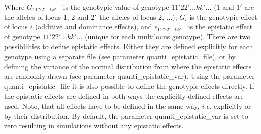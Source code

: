 \documentclass[letterpaper,12pt,oneside]{book}
\begin{document}
Where $G_{11'22'...kk'...}$ is the genotypic value of genotype ${11'22'...kk'...}$ ($1$ and $1'$ are the alleles of locus 1, $2$ and $2'$ the alleles of locus 2, ...), $G_{i}$ is the genotypic effect of locus $i$ (additive and dominance effects), and $\epsilon_{11'22'...kk'...}$ is the epistatic effect of genotype $11'22'...kk'...$ (unique for each multilocus genotype). There are two possibilities to define epistatic effects. Either they are defined explicitly for each genotype using a separate file (see parameter \textsf{quanti\_epistatic\_file}), or by defining the variance of the normal distribution from where the epistatic effects are randomly drawn (see parameter \textsf{quanti\_epistatic\_var}). Using the parameter \textsf{quanti\_epistatic\_file} it is also possible to define the genotypic effects directly. If the epistatic effects are defined in both ways the explicitly defined effects are used. Note, that all effects have to be defined in the same way, \textit{i.e.} explicitly or by their distribution. By default, the parameter \textsf{quanti\_epistatic\_var} is set to zero resulting in simulations without any epistatic effects.
\end{document}

